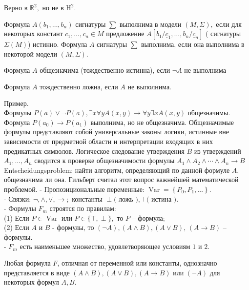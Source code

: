 Верно в $\mathbb{R}^{2},$ но не в $\mathrm{H}^{2}$.
\vskip 0.2in
\begin{defn}
Формула $A\left(b_{1}, \ldots, b_{n}\right)$ сигнатуры $\sum$ выполнима в модели $(M, \Sigma),$ если для некоторых констант $c_{1}, \ldots, c_{n} \in M$ предложение $A\left[b_{1} / \underline{c}_{1}, \ldots, b_{n} / \underline{c}_{n}\right]$ ( сигнатуры $\Sigma(M)$) истинно.
Формула $A$ сигнатуры $\sum$ выполнима, если она выполнима в некоторой модели $(M, \Sigma)$.
\end{defn}
\vskip 0.2in
\begin{defn}
Формула $A$ общезначима (тождественно истинна), если $\neg A$ не выполнима
\end{defn}
\begin{defn}
Формула $A$ тождественно ложна, если $A$ не выполнима.
\end{defn}
Пример.\\
Формулы $P(a) \vee \neg P(a), \exists x \forall y A(x, y) \rightarrow \forall y \exists x A(x, y)$ общезначимы. Формула $P\left(a_{0}\right) \rightarrow P\left(a_{1}\right)$ выполнима, но не общезначима.
\vskip 0.3in
Общезначимые формулы представляют собой универсальные законы логики, истинные вне зависимости от предметной области и интерпретации входящих в них предикатных символов.
\vskip 0.1in
Логическое следование утверждения $B$ из утверждений $A_{1}, \ldots, A_{n}$ сводится к проверке общезначимости формулы $A_{1} \wedge A_{2} \wedge \cdots \wedge A_{n} \rightarrow B$
\vskip 0.1in
Entscheidungsproblem: найти алгоритм, определяющий по данной формуле $A$, общезначима ли она. Гильберт считал этот вопрос важнейшей математической проблемой.
\vskip 0.3in
- Пропозициональные переменные: $\operatorname{Var}=\left\{P_{0}, P_{1}, \ldots\right\}$.\\
- Связки: $\neg, \wedge, \vee, \rightarrow ;$ константы $\perp($ ложь $), \top($ истина $)$.\\
- Формулы $F_m$ строятся по правилам:\\
(1) Если $P \in \operatorname{Var}$ или $P \in\{\top, \perp\},$ то $P$ -- формула;\\
(2) Если $A$ и $B$ - формулы, то $(\neg A),(A \wedge B),(A \vee B)$, $(A \rightarrow B)$ -- формулы.\\
- $F_m$ есть наименьшее множество, удовлетворяющее условиям $1$ и $2$.
\vskip 0.2in
\begin{lem}
Любая формула $F$, отличная от переменной или константы, однозначно представляется в виде $(A \wedge B),(A \vee B),(A \rightarrow B)$ или $(\neg A)$ для некоторых формул $A, B$.
\end{lem}
